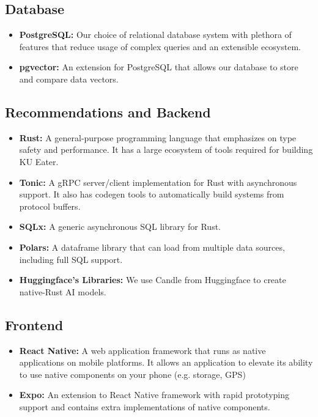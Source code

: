 \subsection{Database}
\begin{itemize}[leftmargin=80pt]
    \item \textbf{PostgreSQL:} Our choice of relational database system with plethora of features that reduce usage of complex queries
    and an extensible ecosystem.
    \item \textbf{pgvector:} An extension for PostgreSQL that allows our database to store and compare data vectors.
\end{itemize}

\subsection{Recommendations and Backend}
\begin{itemize}[leftmargin=80pt]
    \item \textbf{Rust:} A general-purpose programming language that emphasizes on type safety and performance. It has a large ecosystem of tools required for building KU Eater.
    \item \textbf{Tonic:} A gRPC server/client implementation for Rust with asynchronous support. It also has codegen tools to automatically build systems from protocol buffers.
    \item \textbf{SQLx:} A generic asynchronous SQL library for Rust.
    \item \textbf{Polars:} A dataframe library that can load from multiple data sources, including full SQL support.
    \item \textbf{Huggingface's Libraries:} We use Candle from Huggingface to create native-Rust AI models.
\end{itemize}

\subsection{Frontend}
\begin{itemize}[leftmargin=80pt]
    \item \textbf{React Native:} A web application framework that runs as native applications on mobile platforms. It allows an application to elevate
    its ability to use native components on your phone (e.g. storage, GPS)
    \item \textbf{Expo:} An extension to React Native framework with rapid prototyping support and contains extra implementations of native components.
\end{itemize}

